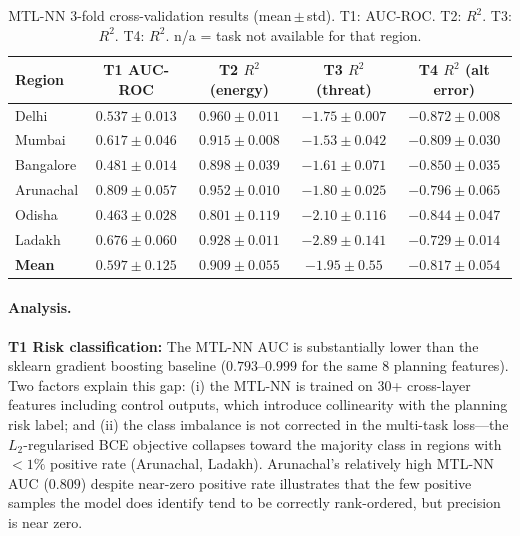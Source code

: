 ﻿\documentclass{article}
\begin{document}
\begin{table}[h]
\centering
\caption{MTL-NN 3-fold cross-validation results (mean\,$\pm$\,std). T1: AUC-ROC.
T2: $R^2$. T3: $R^2$. T4: $R^2$. n/a = task not available for that region.}
\label{tab:nn_results}
\small
\begin{tabular}{lcccc}
\toprule
Region & T1 AUC-ROC & T2 $R^2$ (energy) & T3 $R^2$ (threat) & T4 $R^2$ (alt error) \\
\midrule
Delhi      & $0.537 \pm 0.013$ & $\mathbf{0.960 \pm 0.011}$ & $-1.75 \pm 0.007$ & $-0.872 \pm 0.008$ \\
Mumbai     & $0.617 \pm 0.046$ & $\mathbf{0.915 \pm 0.008}$ & $-1.53 \pm 0.042$ & $-0.809 \pm 0.030$ \\
Bangalore  & $0.481 \pm 0.014$ & $\mathbf{0.898 \pm 0.039}$ & $-1.61 \pm 0.071$ & $-0.850 \pm 0.035$ \\
Arunachal  & $0.809 \pm 0.057$ & $\mathbf{0.952 \pm 0.010}$ & $-1.80 \pm 0.025$ & $-0.796 \pm 0.065$ \\
Odisha     & $0.463 \pm 0.028$ & $\mathbf{0.801 \pm 0.119}$ & $-2.10 \pm 0.116$ & $-0.844 \pm 0.047$ \\
Ladakh     & $0.676 \pm 0.060$ & $\mathbf{0.928 \pm 0.011}$ & $-2.89 \pm 0.141$ & $-0.729 \pm 0.014$ \\
\midrule
\textbf{Mean} & $0.597 \pm 0.125$ & $\mathbf{0.909 \pm 0.055}$ & $-1.95 \pm 0.55$ & $-0.817 \pm 0.054$ \\
\bottomrule
\end{tabular}
\end{table}

\paragraph{Analysis.}
\textbf{T1 Risk classification:} The MTL-NN AUC is substantially lower than
the sklearn gradient boosting baseline ($0.793$--$0.999$ for the same 8 planning
features). Two factors explain this gap: (i) the MTL-NN is trained on 30+
cross-layer features including control outputs, which introduce collinearity
with the planning risk label; and (ii) the class imbalance is not corrected
in the multi-task loss---the $L_2$-regularised BCE objective collapses
toward the majority class in regions with $<1\%$ positive rate (Arunachal, Ladakh).
Arunachal's relatively high MTL-NN AUC ($0.809$) despite near-zero positive rate
illustrates that the few positive samples the model does identify tend to
be correctly rank-ordered, but precision is near zero.
\end{document}
